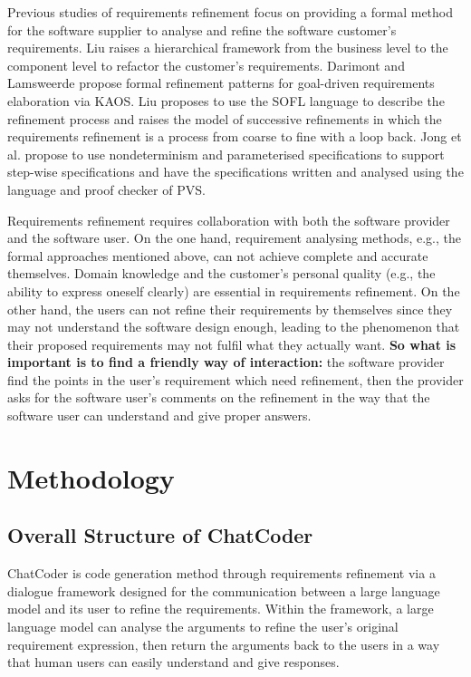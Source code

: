 \documentclass[sigconf]{acmart}
\begin{document}
Previous studies of requirements refinement focus on providing a formal method for the software supplier to analyse and refine the software customer's requirements. Liu \cite{re_framework} raises a hierarchical framework from the business level to the component level to refactor the customer's requirements. Darimont and Lamsweerde \cite{kaos_analyse} propose formal refinement patterns for goal-driven requirements elaboration via KAOS. Liu\cite{sofl_analyse} proposes to use the SOFL language to describe the refinement process and raises the model of successive refinements in which the requirements refinement is a process from coarse to fine with a loop back. Jong et al. propose to use nondeterminism and parameterised specifications to support step-wise specifications and have the specifications written and analysed using the language and proof checker of PVS.

Requirements refinement requires collaboration with both the software provider and the software user. On the one hand, requirement analysing methods, e.g., the formal approaches mentioned above, can not achieve complete and accurate themselves. Domain knowledge and the customer's personal quality (e.g., the ability to express oneself clearly) are essential in requirements refinement. On the other hand, the users can not refine their requirements by themselves since they may not understand the software design enough, leading to the phenomenon that their proposed requirements may not fulfil what they actually want. \textbf{So what is important is to find a friendly way of interaction:} the software provider find the points in the user's requirement which need refinement, then the provider asks for the software user's comments on the refinement in the way that the software user can understand and give proper answers.

\section{Methodology}
\subsection{Overall Structure of ChatCoder}
ChatCoder is code generation method through requirements refinement via a dialogue framework designed for the communication between a large language model and its user to refine the requirements. Within the framework, a large language model can analyse the arguments to refine the user's original requirement expression, then return the arguments back to the users in a way that human users can easily understand and give responses.
\end{document}
